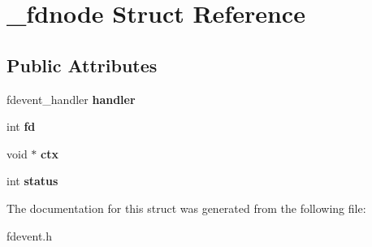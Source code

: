 \hypertarget{struct__fdnode}{
\section{\_\-fdnode Struct Reference}
\label{struct__fdnode}
}
\subsection*{Public Attributes}
\begin{DoxyCompactItemize}
\item 
\hypertarget{struct__fdnode_a197ee75ecdf4018d2b6eec823dc67ff4}{
fdevent\_\-handler {\bfseries handler}}
\label{struct__fdnode_a197ee75ecdf4018d2b6eec823dc67ff4}

\item 
\hypertarget{struct__fdnode_a00a11f60bb26e73cb7fb6e84bb4ffbc4}{
int {\bfseries fd}}
\label{struct__fdnode_a00a11f60bb26e73cb7fb6e84bb4ffbc4}

\item 
\hypertarget{struct__fdnode_ab89a325bfe82c899da15e739a15925b4}{
void $\ast$ {\bfseries ctx}}
\label{struct__fdnode_ab89a325bfe82c899da15e739a15925b4}

\item 
\hypertarget{struct__fdnode_a78291f37d8fcf158e4bae8a0e0036039}{
int {\bfseries status}}
\label{struct__fdnode_a78291f37d8fcf158e4bae8a0e0036039}

\end{DoxyCompactItemize}


The documentation for this struct was generated from the following file:\begin{DoxyCompactItemize}
\item 
fdevent.h\end{DoxyCompactItemize}
